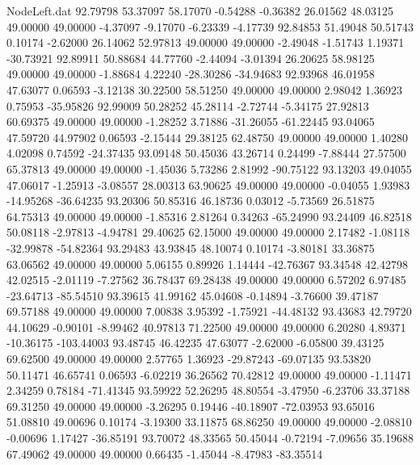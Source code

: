 \begin{filecontents}{NodeLeft.dat}
  92.79798   53.37097   58.17070    -0.54288   -0.36382   26.01562   48.03125   49.00000   49.00000   -4.37097   -9.17070   -6.23339   -4.17739
  92.84853   51.49048   50.51743     0.10174   -2.62000   26.14062   52.97813   49.00000   49.00000   -2.49048   -1.51743    1.19371  -30.73921
  92.89911   50.88684   44.77760    -2.44094   -3.01394   26.20625   58.98125   49.00000   49.00000   -1.88684    4.22240  -28.30286  -34.94683
  92.93968   46.01958   47.63077     0.06593   -3.12138   30.22500   58.51250   49.00000   49.00000    2.98042    1.36923    0.75953  -35.95826
  92.99009   50.28252   45.28114    -2.72744   -5.34175   27.92813   60.69375   49.00000   49.00000   -1.28252    3.71886  -31.26055  -61.22445
  93.04065   47.59720   44.97902     0.06593   -2.15444   29.38125   62.48750   49.00000   49.00000    1.40280    4.02098    0.74592  -24.37435
  93.09148   50.45036   43.26714     0.24499   -7.88444   27.57500   65.37813   49.00000   49.00000   -1.45036    5.73286    2.81992  -90.75122
  93.13203   49.04055   47.06017    -1.25913   -3.08557   28.00313   63.90625   49.00000   49.00000   -0.04055    1.93983  -14.95268  -36.64235
  93.20306   50.85316   46.18736     0.03012   -5.73569   26.51875   64.75313   49.00000   49.00000   -1.85316    2.81264    0.34263  -65.24990
  93.24409   46.82518   50.08118    -2.97813   -4.94781   29.40625   62.15000   49.00000   49.00000    2.17482   -1.08118  -32.99878  -54.82364
  93.29483   43.93845   48.10074     0.10174   -3.80181   33.36875   63.06562   49.00000   49.00000    5.06155    0.89926    1.14444  -42.76367
  93.34548   42.42798   42.02515    -2.01119   -7.27562   36.78437   69.28438   49.00000   49.00000    6.57202    6.97485  -23.64713  -85.54510
  93.39615   41.99162   45.04608    -0.14894   -3.76600   39.47187   69.57188   49.00000   49.00000    7.00838    3.95392   -1.75921  -44.48132
  93.43683   42.79720   44.10629    -0.90101   -8.99462   40.97813   71.22500   49.00000   49.00000    6.20280    4.89371  -10.36175 -103.44003
  93.48745   46.42235   47.63077    -2.62000   -6.05800   39.43125   69.62500   49.00000   49.00000    2.57765    1.36923  -29.87243  -69.07135
  93.53820   50.11471   46.65741     0.06593   -6.02219   36.26562   70.42812   49.00000   49.00000   -1.11471    2.34259    0.78184  -71.41345
  93.59922   52.26295   48.80554    -3.47950   -6.23706   33.37188   69.31250   49.00000   49.00000   -3.26295    0.19446  -40.18907  -72.03953
  93.65016   51.08810   49.00696     0.10174   -3.19300   33.11875   68.86250   49.00000   49.00000   -2.08810   -0.00696    1.17427  -36.85191
  93.70072   48.33565   50.45044    -0.72194   -7.09656   35.19688   67.49062   49.00000   49.00000    0.66435   -1.45044   -8.47983  -83.35514

\end{filecontents}
